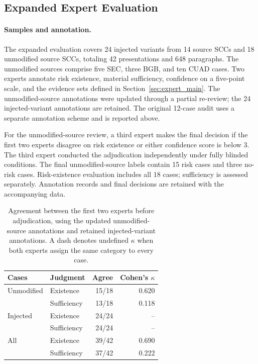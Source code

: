 
\begin{revadded}
\subsection{Expanded Expert Evaluation}
\label{app:expert_extension}

\paragraph{Samples and annotation.}
The expanded evaluation covers 24 injected variants from 14 source SCCs and 18 unmodified source SCCs, totaling 42 presentations and 648 paragraphs. The unmodified sources comprise five SEC, three BGB, and ten CUAD cases. Two experts annotate risk existence, material sufficiency, confidence on a five-point scale, and the evidence sets defined in Section~\ref{sec:expert_main}. The unmodified-source annotations were updated through a partial re-review; the 24 injected-variant annotations are retained. The original 12-case audit uses a separate annotation scheme and is reported above.

For the unmodified-source review, a third expert makes the final decision if the first two experts disagree on risk existence or either confidence score is below 3. The third expert conducted the adjudication independently under fully blinded conditions. The final unmodified-source labels contain 15 risk cases and three no-risk cases. Risk-existence evaluation includes all 18 cases; sufficiency is assessed separately. Annotation records and final decisions are retained with the accompanying data.

\begin{table}[!htbp]
\centering
\renewcommand{\arraystretch}{1.10}
\small
\setlength{\tabcolsep}{3pt}
\begin{tabular}{llrr}
\toprule
\bfseries Cases & \bfseries Judgment & \bfseries Agree & \bfseries Cohen's $\kappa$ \\
\midrule
Unmodified & Existence & 15/18 & 0.620 \\
 & Sufficiency & 13/18 & 0.118 \\
\midrule
Injected & Existence & 24/24 & -- \\
 & Sufficiency & 24/24 & -- \\
\midrule
All & Existence & 39/42 & 0.690 \\
 & Sufficiency & 37/42 & 0.222 \\
\bottomrule
\end{tabular}
\caption{Agreement between the first two experts before adjudication, using the updated unmodified-source annotations and retained injected-variant annotations. A dash denotes undefined $\kappa$ when both experts assign the same category to every case.}
\label{tab:expert_new_agreement}
\end{table}


\end{revadded}

